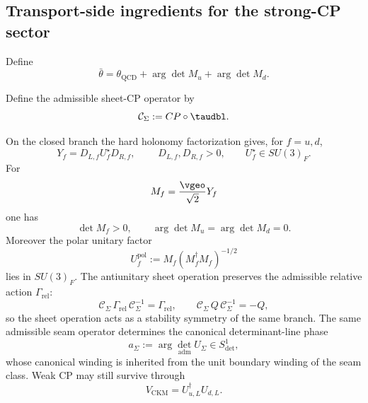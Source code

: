 \subsection{Transport-side ingredients for the strong-CP sector}

Define
\begin{equation}
\label{eq:strong-cp}
\bar\theta=\theta_{\mathrm{QCD}}+\arg\det M_u+\arg\det M_d.
\end{equation}
\begin{definition}
\label{def:sheet-cp-symmetry}
Define the admissible sheet-CP operator by
\[
\mathcal C_\Sigma:=CP\circ\taudbl.
\]
\end{definition}

\begin{theorem}
\label{thm:sheet-cp-protection}
\label{thm:structural-strong-cp}
On the closed branch the hard holonomy factorization gives, for $f=u,d$,
\[
Y_f=D_{L,f}U_f^\star D_{R,f},
\qquad
\;D_{L,f},D_{R,f}>0,
\qquad
U_f^\star\in SU(3)_F.
\]
For
\[
M_f=\frac{\vgeo}{\sqrt2}Y_f
\]
one has
\[
\det M_f>0,
\qquad
\arg\det M_u=\arg\det M_d=0.
\]
Moreover the polar unitary factor
\[
U_f^{\mathrm{pol}}:=M_f(M_f^\dagger M_f)^{-1/2}
\]
lies in $SU(3)_F$. The antiunitary sheet operation
preserves the admissible relative action $\Gamma_{\mathrm{rel}}$:
\[
\mathcal C_\Sigma\,\Gamma_{\mathrm{rel}}\,\mathcal C_\Sigma^{-1}=\Gamma_{\mathrm{rel}},
\qquad
\mathcal C_\Sigma\,Q\,\mathcal C_\Sigma^{-1}=-Q,
\]
so the sheet operation acts as a stability symmetry of the same branch. The same admissible seam
operator determines the canonical determinant-line phase
\[
a_\Sigma:=\arg\det_{\mathrm{adm}}U_\Sigma\in S^1_{\det},
\]
whose canonical winding is inherited from the unit boundary winding of the seam class. Weak CP may
still survive through
\[
V_{\mathrm{CKM}}=U_{u,L}^\dagger U_{d,L}.
\]
\end{theorem}

